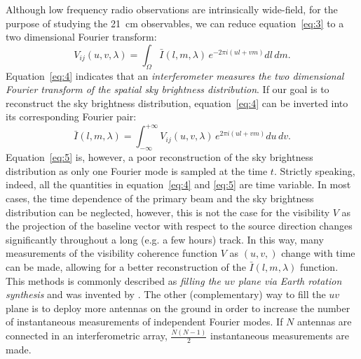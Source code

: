 Although low frequency radio observations are intrinsically wide-field, for the purpose of studying the 21~cm observables, we can reduce equation~\ref{eq:3} to a two dimensional Fourier transform:
\begin{equation}
V_{ij} (u,v, \lambda) = \int_\Omega {\bar I} (l, m, \lambda) \, e^{-2 \pi i (ul + vm)} dl \, dm.
\label{eq:4}
\end{equation}
Equation~\ref{eq:4} indicates that an {\it interferometer measures the two dimensional Fourier transform of the spatial sky brightness distribution}. If our goal is to reconstruct the sky brightness distribution, equation~\ref{eq:4} can be inverted into its corresponding Fourier pair:
\begin{equation}
{\bar I} (l, m, \lambda) = \int_{- \infty}^{+ \infty} V_{ij} (u,v, \lambda) \, e^{2 \pi i (ul + vm)} du \, dv.
\label{eq:5}
\end{equation}
Equation~\ref{eq:5} is, however, a poor reconstruction of the sky brightness distribution as only one Fourier mode is sampled at the time $t$. Strictly speaking, indeed, all the quantities in equation~\ref{eq:4} and \ref{eq:5} are time variable. In most cases, the time dependence of the primary beam and the sky brightness distribution can be neglected, however, this is not the case for the visibility $V$ as the projection of the baseline vector with respect to the source direction changes significantly throughout a long (e.g. a few hours) track. In this way, many measurements of the visibility coherence function $V$ as $(u,v,)$ change with time can be made, allowing for a better reconstruction of the ${\bar I} (l, m, \lambda)$ function. This methods is commonly described as {\it filling the $uv$ plane via Earth rotation synthesis} and was invented by \cite{ryle60}. The other (complementary) way to fill the $uv$ plane is to deploy more antennas on the ground in order to increase the number of instantaneous measurements of independent Fourier modes. If $N$ antennas are connected in an interferometric array, $\frac{N (N - 1)}{2}$ instantaneous measurements are made. 

